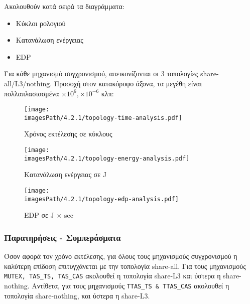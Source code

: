 \documentclass[12pt,a4paper]{article}
\newcommand{\imagesPath}{/home/nick/arch-ntua/ex03/graphs}
\newcommand{\myWidth}{0.8\linewidth}
\begin{document}
				Ακολουθούν κατά σειρά τα διαγράμματα:
				
				\begin{itemize}
					\item Κύκλοι ρολογιού 
					\item Κατανάλωση ενέργειας
					\item EDP
				\end{itemize}
			
				Για κάθε μηχανισμό συγχρονισμού, απεικονίζονται οι 3 τοπολογίες share-all/L3/nothing. Προσοχή στον κατακόρυφο άξονα, τα μεγέθη είναι πολλαπλασιασμένα $\times 10^6, \times 10^{-6}$ κλπ: 
				
				\begin{figure}[H]
					\begin{center}
						\texttt{[image: \\imagesPath/4.2.1/topology-time-analysis.pdf]}
						\caption{Χρόνος εκτέλεσης σε κύκλους}	
				\end{center}
				\end{figure}
			
				\begin{figure}[H]
					\begin{center}
						\texttt{[image: \\imagesPath/4.2.1/topology-energy-analysis.pdf]}
						\caption{Κατανάλωση ενέργειας σε J}
					\end{center}
				\end{figure}
			
				\begin{figure}[H]
					\begin{center}
						\texttt{[image: \\imagesPath/4.2.1/topology-edp-analysis.pdf]}
						\caption{EDP σε J $\times$ sec}	
					\end{center}
				\end{figure}
			
			\subsubsection*{Παρατηρήσεις - Συμπεράσματα}

				Όσον αφορά τον χρόνο εκτέλεσης, για όλους τους μηχανισμούς συγχρονισμού η καλύτερη επίδοση επιτυγχάνεται με την τοπολογία share-all. Για τους μηχανισμούς \verb|MUTEX, TAS_TS, TAS_CAS| ακολουθεί η τοπολογία share-L3 και ύστερα η share-nothing. Αντίθετα, για τους μηχανισμούς \verb|TTAS_TS & TTAS_CAS| ακολουθεί η τοπολογία share-nothing, και ύστερα η share-L3. \\
				
\end{document}
